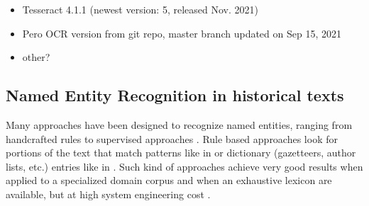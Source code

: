 \begin{itemize}
    \item Tesseract 4.1.1 (newest version: 5, released Nov. 2021)
    \item Pero OCR version from git repo, master branch updated on Sep 15, 2021 %
    \item other?  %
\end{itemize}




\subsection{Named Entity Recognition in historical texts}
\label{subsection:stoa-ner-on-historical-texts}

Many approaches have been designed to recognize named entities, ranging from handcrafted rules to supervised approaches \cite{nadeau2007}.
Rule based approaches look for portions of the text that match patterns like in \cite{bell2020automated,nouvel2011} or dictionary (gazetteers, author lists, etc.) entries like in \cite{mansouri2008,maurel2011}.
Such kind of approaches achieve very good results when applied to a specialized domain corpus and when an exhaustive lexicon are available, but at high system engineering cost \cite{nadeau2007}. 

